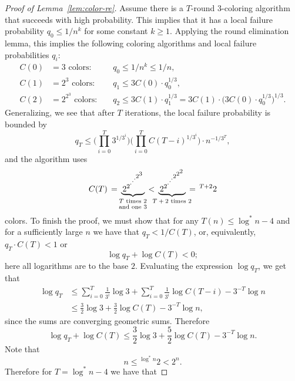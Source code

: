 \begin{proof}[Proof of Lemma~\ref{lem:color-re}]
Assume there is a $T$-round 3-coloring algorithm that succeeds with high probability. This implies that it has a local failure probability $q_0 \leq 1/n^k$ for some constant $k \ge 1$. Applying the round elimination lemma, this implies the following coloring algorithms and local failure probabilities $q_i$:
\begin{align*}
	C(0) &= 3 \text{ colors: }&& q_0 \leq 1/n^k \leq 1/n, \\
	C(1) &= 2^3 \text{ colors: }&& q_1 \leq 3 C(0) \cdot q_0^{1/3}, \\
	C(2) &= 2^{2^3} \text{ colors: }&& q_2 \leq 3 C(1) \cdot q_1^{1/3} = 3 C(1) \cdot \bigl(3 C(0) \cdot q_0^{1/3}\bigr)^{1/3}.
\end{align*}
Generalizing, we see that after $T$ iterations, the local failure probability is bounded by
\[
	q_T \leq \Biggl( \prod_{i=0}^T 3^{1/3^i} \Biggr)\Biggl( \prod_{i=0}^T C(T-i)^{1/3^i} \Biggr) \cdot n^{-1/3^T},
\]
and the algorithm uses
\[
	C(T) \,=\, 
	\underbrace{\,2^{2^{\scriptstyle\cdot^{\scriptstyle\cdot^{\scriptstyle\cdot^{\scriptstyle 2^{\scriptstyle 3}}}}}}}_{\text{\makebox[0pt]{\parbox{3cm}{\centering $T$ times $2$\\[-5pt]and one $3$}}}}
	\,<\,
	\underbrace{\,2^{2^{\scriptstyle\cdot^{\scriptstyle\cdot^{\scriptstyle\cdot^{\scriptstyle 2^{\scriptstyle 2^{\scriptstyle 2}}}}}}}}_{\text{\makebox[0pt]{$T+2$ times $2$}}}
	\,=\, {}^{T+2} 2
\]
colors. To finish the proof, we must show that for any $T(n) \leq \log^* n - 4$ and for a sufficiently large $n$ we have that $q_T < 1/C(T)$, or, equivalently, $q_T \cdot C(T) < 1$ or
\begin{equation} \label{eq:prob}
	\log q_T + \log C(T) < 0;
\end{equation}
here all logarithms are to the base $2$.
Evaluating the expression $\log q_T$, we get that
\begin{align*}
	\log q_T &\leq \sum_{i=0}^T \frac{1}{3^i} \log 3 + \sum_{i=0}^T \frac{1}{3^i} \log C(T-i) - 3^{-T} \log n \\
	&\leq \frac{3}{2}\log 3 + \frac{3}{2}\log C(T) - 3^{-T} \log n,
\end{align*}
since the sums are converging geometric sums. Therefore
\begin{equation}\label{eq:logqTlogCT}
	\log q_T + \log C(T) \le \frac{3}{2}\log 3 + \frac{5}{2}\log C(T) - 3^{-T} \log n.
\end{equation}
Note that
\[
	n \le {}^{\log^* n} 2 < 2^n.
\]
Therefore for $T = \log^* n - 4$ we have that

\end{proof}
